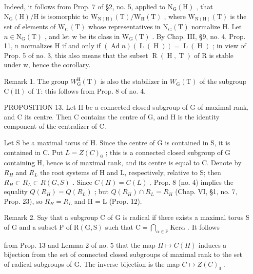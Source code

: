 Indeed, it follows from Prop. 7 of §2, no. 5, applied to \(\mathrm{N}_{\mathrm{G}}(\mathrm{H})\) , that \(\mathrm{N}_{\mathrm{G}}(\mathrm{H})/\mathrm{H}\) is isomorphic to \(\mathrm{W}_{\mathrm{N}(\mathrm{H})}(\mathrm{T})/\mathrm{W}_{\mathrm{H}}(\mathrm{T})\) , where \(\mathrm{W}_{\mathrm{N}(\mathrm{H})}(\mathrm{T})\) is the set of elements of \(\mathrm{W}_{\mathrm{G}}(\mathrm{T})\) whose representatives in \(\mathrm{N}_{\mathrm{G}}(\mathrm{T})\) normalize H. Let \(n \in \mathrm{N}_{\mathrm{G}}(\mathrm{T})\) , and let w be its class in \(\mathrm{W}_{\mathrm{G}}(\mathrm{T})\) . By Chap. III, §9, no. 4, Prop. 11, n normalizes H if and only if \((\operatorname{Ad} n)(\operatorname{L}(\operatorname{H})) = \operatorname{L}(\operatorname{H})\) ; in view of Prop. 5 of no. 3, this also means that the subset \(\operatorname{R}(\operatorname{H}, \operatorname{T})\) of R is stable under w, hence the corollary.

Remark 1. The group \(W_{\mathrm{G}}^{\mathrm{H}}(\mathrm{T})\) is also the stabilizer in \(W_{\mathrm{G}}(\mathrm{T})\) of the subgroup \(\mathrm{C}(\mathrm{H})\) of T: this follows from Prop. 8 of no. 4.

PROPOSITION 13. Let H be a connected closed subgroup of G of maximal rank, and C its centre. Then C contains the centre of G, and H is the identity component of the centralizer of C.

Let S be a maximal torus of H. Since the centre of G is contained in S, it is contained in C. Put \(L = Z(C)_{0}\) ; this is a connected closed subgroup of G containing H, hence is of maximal rank, and its centre is equal to C. Denote by \(R_{H}\) and \(R_{L}\) the root systems of H and L, respectively, relative to S; then \(R_{H} \subset R_{L} \subset R(G, S)\) . Since \(C(H) = C(L)\) , Prop. 8 (no. 4) implies the equality \(Q(R_{H}) = Q(R_{L})\) ; but \(Q(R_{H}) \cap R_{L} = R_{H}\) (Chap. VI, §1, no. 7, Prop. 23), so \(R_{H} = R_{L}\) and H = L (Prop. 12).

Remark 2. Say that a subgroup \(\mathrm{C}\) of \(\mathrm{G}\) is radical if there exists a maximal torus \(\mathrm{S}\) of \(\mathrm{G}\) and a subset \(\mathrm{P}\) of \(\mathrm{R}(\mathrm{G},\mathrm{S})\) such that \(\mathrm{C} = \bigcap_{\alpha \in \mathrm{P}}\mathrm{Ker}\alpha\) . It follows

from Prop. 13 and Lemma 2 of no. 5 that the map \(H \mapsto C(H)\) induces a bijection from the set of connected closed subgroups of maximal rank to the set of radical subgroups of G. The inverse bijection is the map \(C \mapsto Z(C)_{0}\) .

